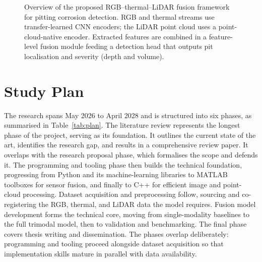 \documentclass[conference]{IEEEtran}
\begin{document}
\begin{figure}[t]
{%
}
\caption{Overview of the proposed RGB--thermal--LiDAR fusion framework for pitting corrosion detection. RGB and thermal streams use transfer-learned CNN encoders; the LiDAR point cloud uses a point-cloud-native encoder. Extracted features are combined in a feature-level fusion module feeding a detection head that outputs pit localisation and severity (depth and volume).}
\label{fig:framework}
\end{figure}

\section{Study Plan}
 
The research spans May 2026 to April 2028 and is structured into six phases, as summarised in Table~\ref{tab:plan}. The literature review represents the longest phase of the project, serving as its foundation. It outlines the current state of the art, identifies the research gap, and results in a comprehensive review paper. It overlaps with the research proposal phase, which formalises the scope and defends it. The programming and tooling phase then builds the technical foundation, progressing from Python and its machine-learning libraries to MATLAB toolboxes for sensor fusion, and finally to C++ for efficient image and point-cloud processing. Dataset acquisition and preprocessing follow, sourcing and co-registering the RGB, thermal, and LiDAR data the model requires. Fusion model development forms the technical core, moving from single-modality baselines to the full trimodal model, then to validation and benchmarking. The final phase covers thesis writing and dissemination. The phases overlap deliberately: programming and tooling proceed alongside dataset acquisition so that implementation skills mature in parallel with data availability.
 
\end{document}
